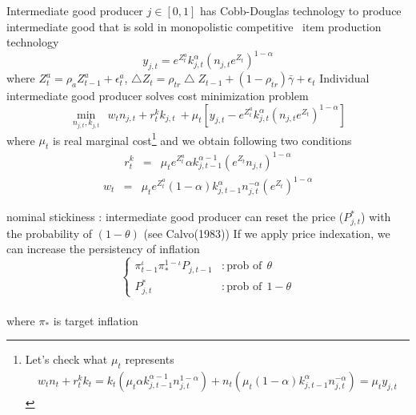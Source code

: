 \documentclass[11pt, a4paper]{article}
\begin{document}
 Intermediate good producer  $j \in [0,1]$ has Cobb-Douglas technology to produce intermediate good that is sold in monopolistic competitive
\ item production technology 
\begin{equation}
y_{j,t} = e^{Z_t^a} k_{j,t}^\alpha \left(n_{j,t} e^{Z_t} \right)^{1-\alpha}
\end{equation}
where $Z_t^a = \rho_a Z_{t-1}^a + \epsilon_t^a$, $\bigtriangleup Z_t = \rho_{tr} \bigtriangleup Z_{t-1} + (1-\rho_{tr}) \bar{\gamma} + \epsilon_t$
 Individual intermediate good producer solves cost minimization problem 
 \begin{displaymath}
\min_{n_{j,t}, k_{j,t}} ~~w_t n_{j,t} + r_t^k k_{j,t} ~+
 \mu_t \left[ y_{j,t} -  e^{Z_t^a} k_{j,t}^\alpha \left(n_{j,t} e^{Z_t} \right)^{1-\alpha} \right]
\end{displaymath}
where $\mu_t$ is real marginal cost\footnote{Let's check what $\mu_t$ represents
 \begin{eqnarray} w_t n_t + r_t^k k_t = k_t (\mu_t \alpha k_{j,t-1}^{\alpha-1}n_{j,t}^{1-\alpha})+ n_t (\mu_t (1-\alpha) k_{j,t-1}^{\alpha}n_{j,t}^{-\alpha}) = \mu_t y_{j,t} \end{eqnarray}   } and we obtain following two conditions
 \begin{eqnarray} r_t^k &=& \mu_t e^{Z_t^a} \alpha k_{j,t-1}^{\alpha-1} (e^{Z_{t}} n_{j,t})^{1-\alpha} 
\end{eqnarray}    
 \begin{eqnarray}
  w_t &=& \mu_t e^{Z_t^a} (1-\alpha) k_{j,t-1}^{\alpha}n_{j,t}^{-\alpha}(e^{Z_{t}})^{1-\alpha}
\end{eqnarray}    
 

 nominal stickiness : intermediate good producer can reset the price ($P_{j,t}^*$) with the probability of $(1-\theta)$ (see Calvo(1983)) 
If we apply price indexation, we can increase the persistency of inflation
 \begin{displaymath}
\left\lbrace \begin{array}{ll}
 \pi_{t-1}^\iota \pi_*^{1-\iota} P_{j,t-1} &:\textrm{prob of}  ~~\theta\\
 P_{j,t}^* &:\textrm{prob of} ~~ 1-\theta
\end{array} \right.
 \end{displaymath}\\
 where $\pi_*$ is target inflation
 
\end{document}
